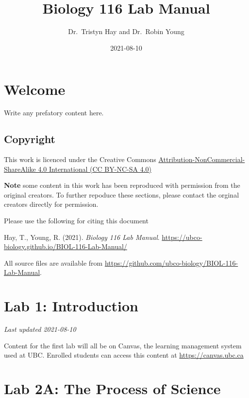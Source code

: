 \documentclass[
]{book}
\title{Biology 116 Lab Manual}
\author{Dr.~Tristyn Hay and Dr.~Robin Young}
\date{2021-08-10}
\begin{document}
\maketitle

{
\setcounter{tocdepth}{1}
\tableofcontents
}
\hypertarget{welcome}{%
\chapter*{Welcome}\label{welcome}}

Write any prefatory content here.

\hypertarget{copyright}{%
\section*{Copyright}\label{copyright}}

This work is licenced under the Creative Commons \href{https://creativecommons.org/licenses/by-nc-sa/4.0/}{Attribution-NonCommercial-ShareAlike 4.0 International (CC BY-NC-SA 4.0)}

\textbf{Note} some content in this work has been reproduced with permission from the original creators. To further repoduce these sections, please contact the orginal creators directly for permission.

Please use the following for citing this document

Hay, T., Young, R. (2021). \emph{Biology 116 Lab Manual}. \url{https://ubco-biology.github.io/BIOL-116-Lab-Manual/}

All source files are available from \url{https://github.com/ubco-biology/BIOL-116-Lab-Manual}.

\hypertarget{lab-1-introduction}{%
\chapter*{Lab 1: Introduction}\label{lab-1-introduction}}

\emph{Last updated 2021-08-10}

Content for the first lab will all be on Canvas, the learning management system used at UBC. Enrolled students can access this content at \url{https://canvas.ubc.ca}

\hypertarget{lab-2a-the-process-of-science}{%
\chapter*{Lab 2A: The Process of Science}\label{lab-2a-the-process-of-science}}
\end{document}
